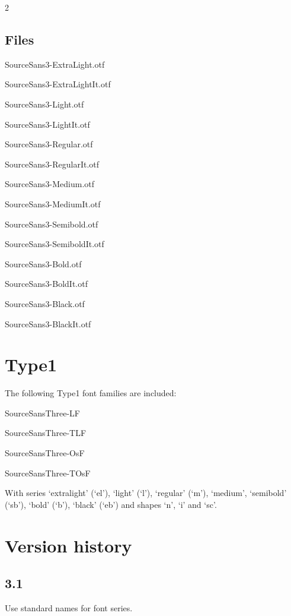 \documentclass[10pt,a4paper,english]{article}
\begin{document}
\begin{multicols}{2}
\subsection{Files}
\begin{itemize*}
	\item SourceSans3-ExtraLight.otf
	\item SourceSans3-ExtraLightIt.otf
	\item SourceSans3-Light.otf
	\item SourceSans3-LightIt.otf
	\item SourceSans3-Regular.otf
	\item SourceSans3-RegularIt.otf
	\item SourceSans3-Medium.otf
	\item SourceSans3-MediumIt.otf
	\item SourceSans3-Semibold.otf
	\item SourceSans3-SemiboldIt.otf
	\item SourceSans3-Bold.otf
	\item SourceSans3-BoldIt.otf
	\item SourceSans3-Black.otf
	\item SourceSans3-BlackIt.otf
\end{itemize*}

\section{Type1}
The following Type1 font families are included:
\begin{itemize*}
	\item SourceSansThree-LF
	\item SourceSansThree-TLF
	\item SourceSansThree-OsF
	\item SourceSansThree-TOsF
\end{itemize*}

With series ‘extralight’ (‘el’), ‘light’ (‘l’), ‘regular’ (‘m’), ‘medium’, ‘semibold’ (‘sb’), ‘bold’ (‘b’), ‘black’ (‘eb’) and shapes ‘n’, ‘i’ and ‘sc’.

\section{Version history}
\subsection*{3.1}
\begin{itemize*}
    \item Use standard names for font series.
\end{itemize*}


\end{multicols}
\end{document}
